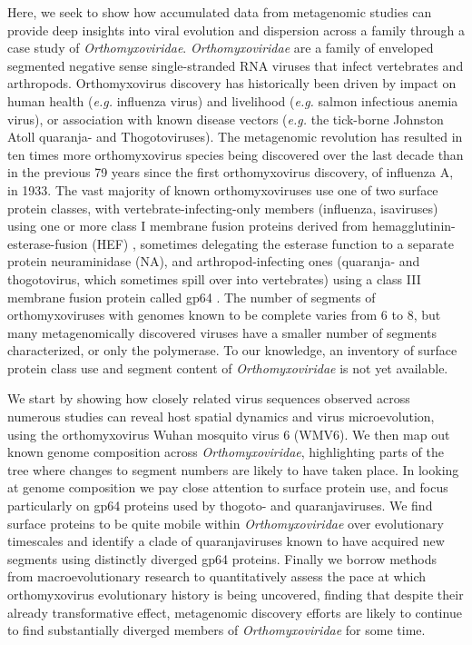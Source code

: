\documentclass[11pt,twocolumn]{article}
\begin{document}
Here, we seek to show how accumulated data from metagenomic studies can provide deep insights into viral evolution and dispersion across a family through a case study of \textit{Orthomyxoviridae}. \textit{Orthomyxoviridae} are a family of enveloped segmented negative sense single-stranded RNA viruses that infect vertebrates and arthropods.
Orthomyxovirus discovery has historically been driven by impact on human health (\textit{e.g.} influenza virus) and livelihood (\textit{e.g.} salmon infectious anemia virus), or association with known disease vectors (\textit{e.g.} the tick-borne Johnston Atoll quaranja- and Thogotoviruses). The metagenomic revolution has resulted in ten times more orthomyxovirus species being discovered over the last decade than in the previous 79 years since the first orthomyxovirus discovery, of influenza A, in 1933. The vast majority of known orthomyxoviruses use one of two surface protein classes, with vertebrate-infecting-only members (influenza, isaviruses) using one or more class I membrane fusion proteins derived from hemagglutinin-esterase-fusion (HEF) \citep{parry_divergent_2020}, sometimes delegating the esterase function to a separate protein neuraminidase (NA), and arthropod-infecting ones (quaranja- and thogotovirus, which sometimes spill over into vertebrates) using a class III membrane fusion protein called gp64 \citep{garry_proteomics_2008}. The number of segments of orthomyxoviruses with genomes known to be complete varies from 6 to 8, but many metagenomically discovered viruses have a smaller number of segments characterized, or only the polymerase. To our knowledge, an inventory of surface protein class use and segment content of \textit{Orthomyxoviridae} is not yet available.


We start by showing how closely related virus sequences observed across numerous studies can reveal host spatial dynamics and virus microevolution, using the orthomyxovirus Wuhan mosquito virus 6 (WMV6).
We then map out known genome composition across \textit{Orthomyxoviridae}, highlighting parts of the tree where changes to segment numbers are likely to have taken place.
In looking at genome composition we pay close attention to surface protein use, and focus particularly on gp64 proteins used by thogoto- and quaranjaviruses.
We find surface proteins to be quite mobile within \textit{Orthomyxoviridae} over evolutionary timescales and identify a clade of quaranjaviruses known to have acquired new segments using distinctly diverged gp64 proteins.
Finally we borrow methods from macroevolutionary research to quantitatively assess the pace at which orthomyxovirus evolutionary history is being uncovered, finding that despite their already transformative effect, metagenomic discovery efforts are likely to continue to find substantially diverged members of \textit{Orthomyxoviridae} for some time.
\end{document}
